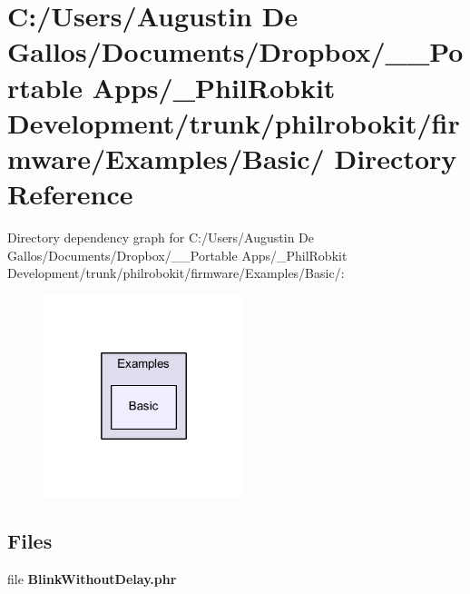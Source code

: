 \section{C\-:/\-Users/\-Augustin De Gallos/\-Documents/\-Dropbox/\-\_\-\-\_\-\-Portable Apps/\-\_\-\-Phil\-Robkit Development/trunk/philrobokit/firmware/\-Examples/\-Basic/ Directory Reference}
\label{dir_a1812af4d590e2a03b057e216380778b}
Directory dependency graph for C\-:/\-Users/\-Augustin De Gallos/\-Documents/\-Dropbox/\-\_\-\-\_\-\-Portable Apps/\-\_\-\-Phil\-Robkit Development/trunk/philrobokit/firmware/\-Examples/\-Basic/\-:\nopagebreak
\begin{figure}[H]
\begin{center}
\leavevmode
\includegraphics[width=166pt]{dir_a1812af4d590e2a03b057e216380778b_dep}
\end{center}
\end{figure}
\subsection*{Files}
\begin{DoxyCompactItemize}
\item 
file {\bf Blink\-Without\-Delay.\-phr}
\end{DoxyCompactItemize}
